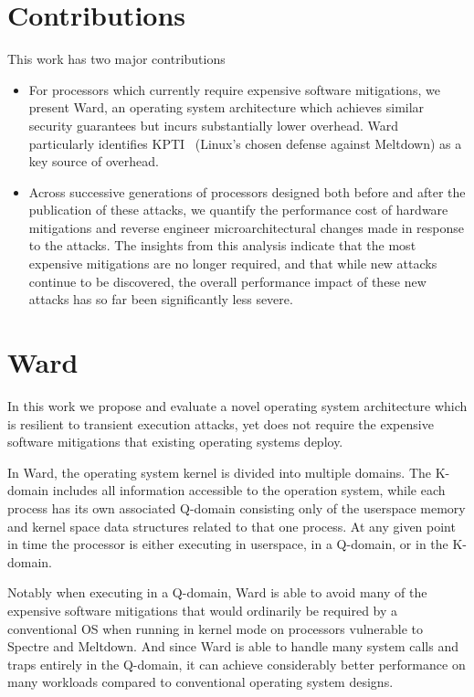 \section*{Contributions}
This work has two major contributions
\begin{itemize}
\item For processors which currently require expensive software mitigations, we present Ward, an operating system architecture which achieves similar security guarantees but incurs substantially lower overhead.
Ward particularly identifies KPTI~\cite{linux:kpti} (Linux's chosen defense against Meltdown) as a key source of overhead.

\item Across successive generations of processors designed both before and after the publication of these attacks, we quantify the performance cost of hardware mitigations and reverse engineer microarchitectural changes made in response to the attacks.
The insights from this analysis indicate that the most expensive mitigations are no longer required, and that while new attacks continue to be discovered, the overall performance impact of these new attacks has so far been significantly less severe.
\end{itemize}

\section*{Ward}
In this work we propose and evaluate a novel operating system architecture which is resilient to transient execution attacks, yet does not require the expensive software mitigations that existing operating systems deploy. 

In Ward, the operating system kernel is divided into multiple domains.
The K-domain includes all information accessible to the operation system, while each process has its own associated Q-domain consisting only of the userspace memory and kernel space data structures related to that one process.
At any given point in time the processor is either executing in userspace, in a Q-domain, or in the K-domain. 

Notably when executing in a Q-domain, Ward is able to avoid many of the expensive software mitigations that would ordinarily be required by a conventional OS when running in kernel mode on processors vulnerable to Spectre and Meltdown.
And since Ward is able to handle many system calls and traps entirely in the Q-domain, it can achieve considerably better performance on many workloads compared to conventional operating system designs.

